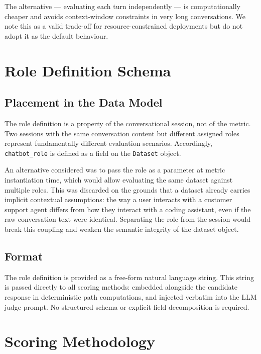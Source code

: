 \documentclass[11pt,a4paper]{article}
\begin{document}
The alternative --- evaluating each turn independently --- is computationally
cheaper and avoids context-window constraints in very long conversations. We
note this as a valid trade-off for resource-constrained deployments but do not
adopt it as the default behaviour.

\section{Role Definition Schema}

\subsection{Placement in the Data Model}

The role definition is a property of the conversational session, not of the
metric. Two sessions with the same conversation content but different assigned
roles represent fundamentally different evaluation scenarios. Accordingly,
\texttt{chatbot\_role} is defined as a field on the \texttt{Dataset} object.

An alternative considered was to pass the role as a parameter at metric
instantiation time, which would allow evaluating the same dataset against
multiple roles. This was discarded on the grounds that a dataset already
carries implicit contextual assumptions: the way a user interacts with a
customer support agent differs from how they interact with a coding assistant,
even if the raw conversation text were identical. Separating the role from the
session would break this coupling and weaken the semantic integrity of the
dataset object.

\subsection{Format}

The role definition is provided as a free-form natural language string.
This string is passed directly to all scoring methods: embedded alongside
the candidate response in deterministic path computations, and injected
verbatim into the LLM judge prompt. No structured schema or explicit field
decomposition is required.

\section{Scoring Methodology}
\label{sec:scoring}
\end{document}
